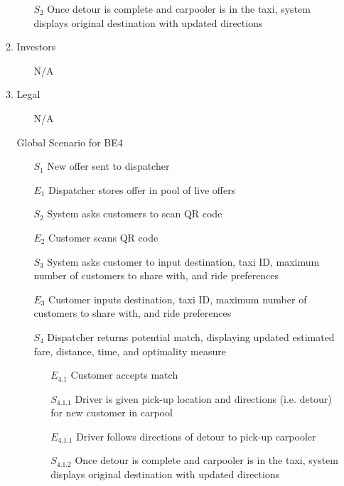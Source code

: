 \documentclass[]{article}
\begin{document}
\begin{enumerate}[{\textbf{BE}}1.]
\begin{enumerate}[{VP4}.1]
\begin{enumerate}
                \item[$S_2$] Once detour is complete and carpooler is in the taxi, system displays original destination with updated directions
            \end{enumerate}
        \item Investors
            \begin{enumerate}
                \item[N/A]
            \end{enumerate}
        \item Legal
            \begin{enumerate}
                \item[N/A]
            \end{enumerate}
        \item[Global] Scenario for BE4
            \begin{enumerate}
                \item[$S_1$] New offer sent to dispatcher
                \item[$E_1$] Dispatcher stores offer in pool of live offers
                \item[$S_2$] System asks customers to scan QR code
                \item[$E_2$] Customer scans QR code
                \item[$S_3$] System asks customer to input destination, taxi ID, maximum number of customers to share with, and ride preferences
                \item[$E_3$] Customer inputs destination, taxi ID, maximum number of customers to share with, and ride preferences
                \item[$S_4$] Dispatcher returns potential match, displaying updated estimated fare, distance, time, and optimality measure
                \begin{enumerate}
                    \item[$E_{4.1}$] Customer accepts match
                    	\item[$S_{4.1.1}$] Driver is given pick-up location and directions (i.e. detour) for new customer in carpool
                    	\item[$E_{4.1.1}$] Driver follows directions of detour to pick-up carpooler
                    	\item[$S_{4.1.2}$] Once detour is complete and carpooler is in the taxi, system displays original destination with updated directions
                \end{enumerate}

\end{enumerate}
\end{enumerate}
\end{enumerate}
\end{document}

